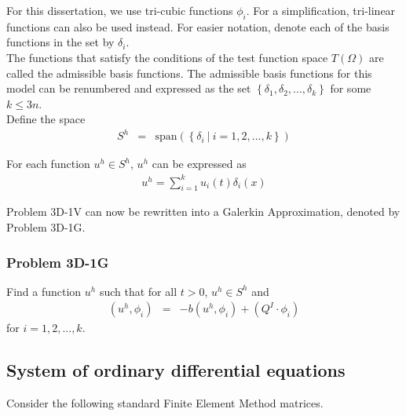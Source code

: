 \documentclass[../../main.tex]{subfiles}
\begin{document}
For this dissertation, we use tri-cubic functions $\phi_i$. For a simplification, tri-linear functions can also be used instead. For easier notation, denote each of the basis functions in the set by $\delta_i$.\\

The functions that satisfy the conditions of the test function space $T(\Omega)$ are called the admissible basis functions. The admissible basis functions for this model can be renumbered and expressed as the set $\left\{\delta_1, \delta_2, ..., \delta_k \right\}$ for some $k \leq 3n$.\\

Define the space
\begin{eqnarray*}
	S^h & = & \textrm{span}\left(\left\{\delta_i \ | \ i = 1,2,...,k \right\} \right)
\end{eqnarray*}

For each function $u^h \in S^h$, $u^h$ can be expressed as
\begin{eqnarray*}
	u^h = \sum_{i = 1}^{k} u_i(t) \delta_{i}(x)
\end{eqnarray*}

Problem 3D-1V can now be rewritten into a Galerkin Approximation, denoted by Problem 3D-1G.


\subsubsection{Problem 3D-1G}
Find a function $u^h$ such that for all $t>0$, $u^h \in S^h$ and
\begin{eqnarray*}
	(u^h, \phi_i) & = & -b(u^h,\phi_i) + (Q^I \cdot \phi_i)
\end{eqnarray*} for $i = 1,2,...,k$.\\

\subsection{System of ordinary differential equations}
Consider the following standard Finite Element Method matrices.
\end{document}
